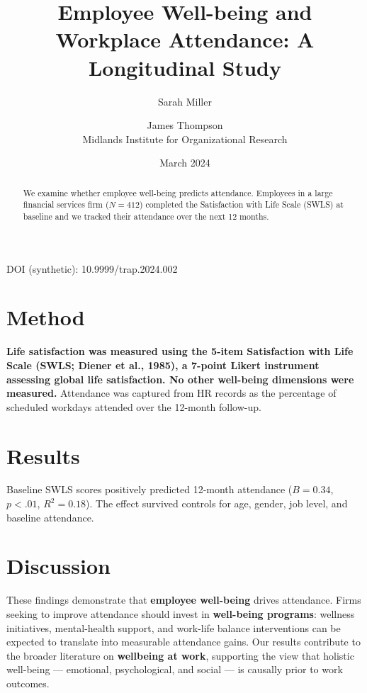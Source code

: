 \documentclass[11pt]{article}
\title{Employee Well-being and Workplace Attendance: A Longitudinal Study}
\author{Sarah Miller \and James Thompson \\ Midlands Institute for Organizational Research}
\date{March 2024}
\begin{document}
\maketitle
\noindent DOI (synthetic): 10.9999/trap.2024.002

\begin{abstract}
We examine whether employee well-being predicts attendance. Employees in a large financial services firm ($N = 412$) completed the Satisfaction with Life Scale (SWLS) at baseline and we tracked their attendance over the next 12 months.
\end{abstract}

\section{Method}
\textbf{Life satisfaction was measured using the 5-item Satisfaction with Life Scale (SWLS; Diener et al., 1985), a 7-point Likert instrument assessing global life satisfaction. No other well-being dimensions were measured.} Attendance was captured from HR records as the percentage of scheduled workdays attended over the 12-month follow-up.

\section{Results}
Baseline SWLS scores positively predicted 12-month attendance ($B = 0.34$, $p < .01$, $R^2 = 0.18$). The effect survived controls for age, gender, job level, and baseline attendance.

\section{Discussion}
These findings demonstrate that \textbf{employee well-being} drives attendance. Firms seeking to improve attendance should invest in \textbf{well-being programs}: wellness initiatives, mental-health support, and work-life balance interventions can be expected to translate into measurable attendance gains. Our results contribute to the broader literature on \textbf{wellbeing at work}, supporting the view that holistic well-being — emotional, psychological, and social — is causally prior to work outcomes.
\end{document}
